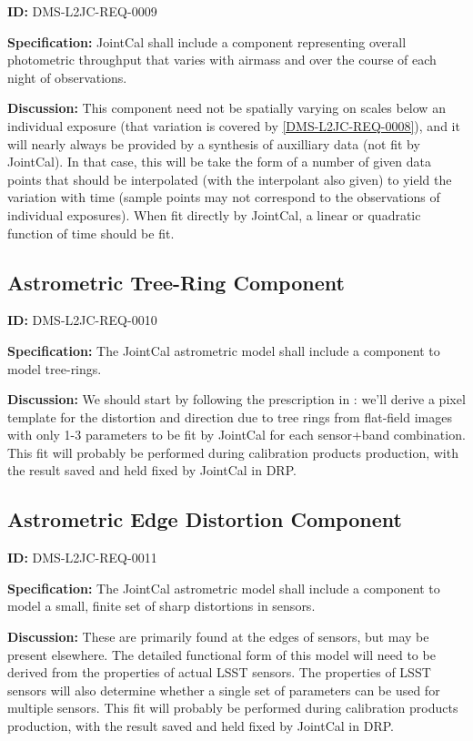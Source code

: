 \documentclass[SE,toc,lsstdraft]{lsstdoc}
\begin{document}
\label{DMS-L2JC-REQ-0009}
\textbf{ID:} DMS-L2JC-REQ-0009

\textbf{Specification:}
JointCal shall include a component representing overall photometric throughput that varies with airmass and over the course of each night of observations.

\textbf{Discussion:}
This component need not be spatially varying on scales below an individual exposure (that variation is covered by \ref{DMS-L2JC-REQ-0008}), and it will nearly always be provided by a synthesis of auxilliary data (not fit by JointCal).  In that case, this will be take the form of a number of given data points that should be interpolated (with the interpolant also given) to yield the variation with time (sample points may not correspond to the observations of individual exposures).  When fit directly by JointCal, a linear or quadratic function of time should be fit.

\subsection{Astrometric Tree-Ring Component}

\label{DMS-L2JC-REQ-0010}
\textbf{ID:} DMS-L2JC-REQ-0010

\textbf{Specification:}
The JointCal astrometric model shall include a component to model tree-rings.

\textbf{Discussion:}
We should start by following the prescription in \citep{2017PASP..129g4503B}: we'll derive a pixel template for the distortion and direction due to tree rings from flat-field images with only 1-3 parameters to be fit by JointCal for each sensor+band combination.  This fit will probably be performed during calibration products production, with the result saved and held fixed by JointCal in DRP.

\subsection{Astrometric Edge Distortion Component}

\label{DMS-L2JC-REQ-0011}
\textbf{ID:} DMS-L2JC-REQ-0011

\textbf{Specification:}
The JointCal astrometric model shall include a component to model a small, finite set of sharp distortions in sensors.

\textbf{Discussion:}
These are primarily found at the edges of sensors, but may be present elsewhere.  The detailed functional form of this model will need to be derived from the properties of actual LSST sensors.  The properties of LSST sensors will also determine whether a single set of parameters can be used for multiple sensors.  This fit will probably be performed during calibration products production, with the result saved and held fixed by JointCal in DRP.
\end{document}
